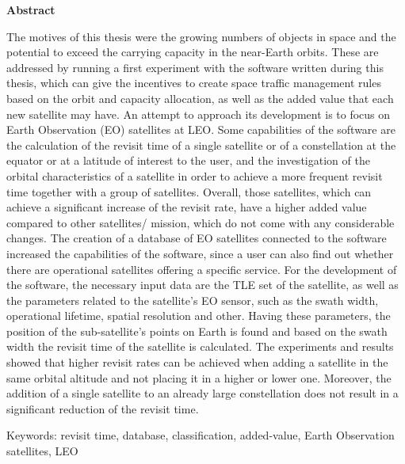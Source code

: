 \newpage \mbox{} %
\newpage \mbox{}
\thispagestyle{empty}
\begin{center}
\Large{\textbf{Abstract}} 
\end{center}
\bigskip
\par 	
The motives of this thesis were the growing numbers of objects in space and the potential to exceed the carrying capacity in the near-Earth orbits. These are addressed by running a first experiment with the software written during this thesis, which can give the incentives to create space traffic management rules based on the orbit and capacity allocation, as well as the added value that each new satellite may have. An attempt to approach its development is to focus on Earth Observation (EO) satellites at LEO. Some capabilities of the software are the calculation of the revisit time of a single satellite or of a constellation at the equator or at a latitude of interest to the user, and the investigation of the orbital characteristics of a satellite in order to achieve a more frequent revisit time together with a group of satellites. Overall, those satellites, which can achieve a significant increase of the revisit rate, have a higher added value compared to other satellites/ mission, which do not come with any considerable changes. The creation of a database of EO satellites connected to the software increased the capabilities of the software, since a user can also find out whether there are operational satellites offering a specific service. For the development of the software, the necessary input data are the TLE set of the satellite, as well as the parameters related to the satellite’s EO sensor, such as the swath width, operational lifetime, spatial resolution and other. Having these parameters, the position of the sub-satellite’s points on Earth is found and based on the swath width the revisit time of the satellite is calculated. The experiments and results showed that higher revisit rates can be achieved when adding a satellite in the same orbital altitude and not placing it in a higher or lower one. Moreover, the addition of a single satellite to an already large constellation does not result in a significant reduction of the revisit time.

Keywords: revisit time, database, classification, added-value, Earth Observation satellites, LEO

% 

